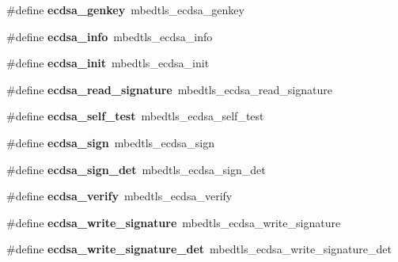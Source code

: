 \begin{DoxyCompactItemize}
\item 
\mbox{\label{compat-1_83_8h_ac5b5a9c03ad7266d7054cdf8e67da9c9}} 
\#define {\bfseries ecdsa\+\_\+genkey}~mbedtls\+\_\+ecdsa\+\_\+genkey
\item 
\mbox{\label{compat-1_83_8h_a28765158c27ec9f41e541bbfe78205b3}} 
\#define {\bfseries ecdsa\+\_\+info}~mbedtls\+\_\+ecdsa\+\_\+info
\item 
\mbox{\label{compat-1_83_8h_ab0a085cafe4bac982e30d0749c411a65}} 
\#define {\bfseries ecdsa\+\_\+init}~mbedtls\+\_\+ecdsa\+\_\+init
\item 
\mbox{\label{compat-1_83_8h_ab28c1304ef0d5cc4303d8e7d6d1d302e}} 
\#define {\bfseries ecdsa\+\_\+read\+\_\+signature}~mbedtls\+\_\+ecdsa\+\_\+read\+\_\+signature
\item 
\mbox{\label{compat-1_83_8h_afef389c9905c068cd77d49d0e855df24}} 
\#define {\bfseries ecdsa\+\_\+self\+\_\+test}~mbedtls\+\_\+ecdsa\+\_\+self\+\_\+test
\item 
\mbox{\label{compat-1_83_8h_a2508bc01c2a2e13f390ba1deabd85ae2}} 
\#define {\bfseries ecdsa\+\_\+sign}~mbedtls\+\_\+ecdsa\+\_\+sign
\item 
\mbox{\label{compat-1_83_8h_ab9b7415204b91fa0d02b87704618a432}} 
\#define {\bfseries ecdsa\+\_\+sign\+\_\+det}~mbedtls\+\_\+ecdsa\+\_\+sign\+\_\+det
\item 
\mbox{\label{compat-1_83_8h_a70b126590644788256d79a0843ad932f}} 
\#define {\bfseries ecdsa\+\_\+verify}~mbedtls\+\_\+ecdsa\+\_\+verify
\item 
\mbox{\label{compat-1_83_8h_a80e53adf840b815aa3745b6311747254}} 
\#define {\bfseries ecdsa\+\_\+write\+\_\+signature}~mbedtls\+\_\+ecdsa\+\_\+write\+\_\+signature
\item 
\mbox{\label{compat-1_83_8h_ad02313b5535aef614d44f471c964e5c0}} 
\#define {\bfseries ecdsa\+\_\+write\+\_\+signature\+\_\+det}~mbedtls\+\_\+ecdsa\+\_\+write\+\_\+signature\+\_\+det
\item 

\end{DoxyCompactItemize}
